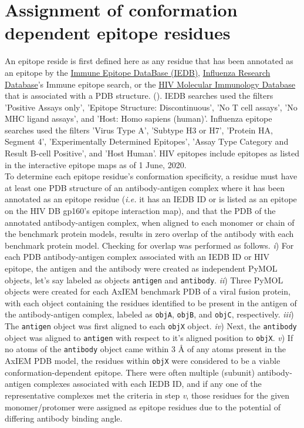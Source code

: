 \documentclass[10pt]{article}
\begin{document}
\section{Assignment of conformation dependent epitope residues}

An epitope reside is first defined here as any residue that has been annotated as an epitope by the \href{https://www.iedb.org}{Immune Epitope DataBase (IEDB)}, \href{https://www.fludb.org}{Influenza Research Database}'s Immune epitope search, or the \href{https://www.hiv.lanl.gov/components/sequence/HIV/featuredb/search/env_ab_search_pub.comp}{HIV Molecular Immunology Database} that is associated with a PDB structure. (). IEDB searches used the filters 'Positive Assays only', 'Epitope Structure: Discontinuous', 'No T cell assays', 'No MHC ligand assays', and 'Host: Homo sapiens (human)'. Influenza epitope searches used the filters 'Virus Type A', 'Subtype H3 or H7', 'Protein HA, Segment 4', 'Experimentally Determined Epitopes', 'Assay Type Category and Result B-cell Positive', and 'Host Human'. HIV epitopes include epitopes as listed in the interactive epitope maps as of 1 June, 2020.\\

To determine each epitope residue's conformation specificity, a residue must have at least one PDB structure of an antibody-antigen complex where it has been annotated as an epitope residue (\textit{i.e.} it has an IEDB ID or is listed as an epitope on the HIV DB gp160's epitope interaction map), and that the PDB of the annotated antibody-antigen complex, when aligned to each monomer or chain of the benchmark protein models, results in zero overlap of the antibody with each benchmark protein model. Checking for overlap was performed as follows. \textit{i}) For each PDB antibody-antigen complex associated with an IEDB ID or HIV epitope, the antigen and the antibody were created as independent PyMOL objects, let's say labeled as objects \texttt{antigen} and \texttt{antibody}. \textit{ii}) Three PyMOL objects were created for each AxIEM benchmark PDB of a viral fusion protein, with each object containing the residues identified to be present in the antigen of the antibody-antigen complex, labeled as \texttt{objA}, \texttt{objB}, and \texttt{objC}, respectively. \textit{iii}) The \texttt{antigen} object was first aligned to each \texttt{objX} object. \textit{iv}) Next, the \texttt{antibody} object was aligned to \texttt{antigen} with respect to it's aligned position to \texttt{objX}. \textit{v}) If no atoms of the \texttt{antibody} object came within 3 \r{A} of any atoms present in the AxIEM PDB model, the residues within \texttt{objX} were  considered to be a viable conformation-dependent epitope. There were often multiple (subunit) antibody-antigen complexes associated with each IEDB ID, and if any one of the representative complexes met the criteria in step \textit{v}, those residues for the given monomer/protomer were assigned as epitope residues due to the potential of differing antibody binding angle. \\   
\end{document}
